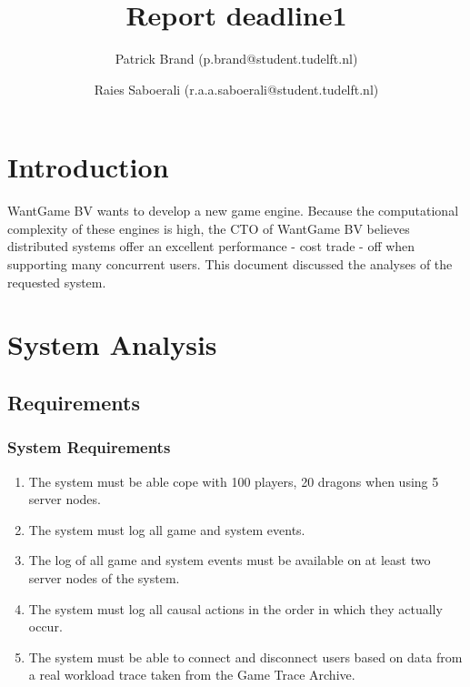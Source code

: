 \documentclass{article}
\title{Report deadline1
}
\author{Patrick Brand (p.brand@student.tudelft.nl) \and
    Raies Saboerali (r.a.a.saboerali@student.tudelft.nl)}
\date{}
\begin{document}
\maketitle
\thispagestyle{empty}

\newpage

\section{Introduction}
WantGame BV wants to develop a new game engine. Because the computational complexity of these engines is high, the CTO of WantGame BV believes distributed systems offer an excellent performance - cost trade - off when supporting many concurrent users. This document discussed the analyses of the requested system.

\section{System Analysis}
\subsection{Requirements}
\subsubsection{System Requirements}
\begin{enumerate}
	\item The system must be able cope with 100 players, 20 dragons when using 5 server nodes.
	\item The system must log all game and system events.
	\item The log of all game and system events must be available on at least two server nodes of the system.
	\item The system must log all causal actions in the order in which they actually occur.
	\item The system must be able to connect and disconnect users based on data from a real workload trace taken from the Game Trace Archive.
\end{enumerate}
\end{document}
